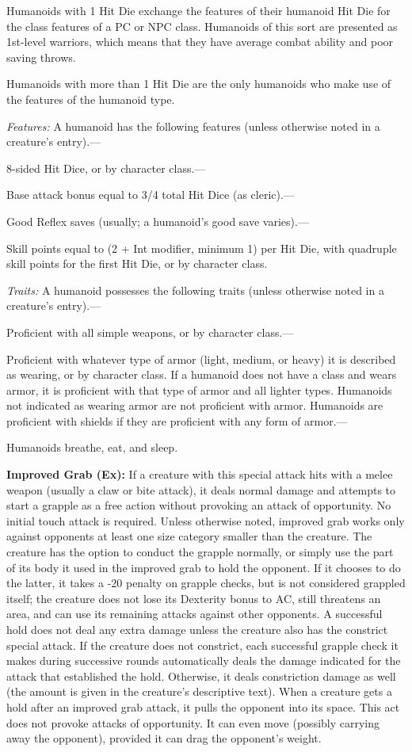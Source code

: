 \documentclass{article}
\begin{document}
Humanoids with 1 Hit Die exchange the features of their humanoid Hit Die for the 
class features of a PC or NPC class. Humanoids of this sort are presented as 1st-level 
warriors, which means that they have average combat ability and poor saving throws.

Humanoids with more than 1 Hit Die are the only humanoids who make use of the features 
of the humanoid type.

\textit{Features: }A humanoid has the following features (unless otherwise noted 
in a creature's entry).---

8-sided Hit Dice, or by character class.---

Base attack bonus equal to 3/4 total Hit Dice (as cleric).---

Good Reflex saves (usually; a humanoid's good save varies).---

Skill points equal to (2 + Int modifier, minimum 1) per Hit Die, with quadruple 
skill points for the first Hit Die, or by character class.

\textit{Traits: }A humanoid possesses the following traits (unless otherwise noted 
in a creature's entry).---

Proficient with all simple weapons, or by character class.---

Proficient with whatever type of armor (light, medium, or heavy) it is described 
as wearing, or by character class. If a humanoid does not have a class and wears 
armor, it is proficient with that type of armor and all lighter types. Humanoids 
not indicated as wearing armor are not proficient with armor. Humanoids are proficient 
with shields if they are proficient with any form of armor.---

Humanoids breathe, eat, and sleep.

\vspace{12pt}
\textbf{Improved Grab (Ex):} If a creature with this special attack hits with a 
melee weapon (usually a claw or bite attack), it deals normal damage and attempts 
to start a grapple as a free action without provoking an attack of opportunity. 
No initial touch attack is required. Unless otherwise noted, improved grab works 
only against opponents at least one size category smaller than the creature. The 
creature has the option to conduct the grapple normally, or simply use the part 
of its body it used in the improved grab to hold the opponent. If it chooses to 
do the latter, it takes a -20 penalty on grapple checks, but is not considered 
grappled itself; the creature does not lose its Dexterity bonus to AC, still threatens 
an area, and can use its remaining attacks against other opponents. A successful 
hold does not deal any extra damage unless the creature also has the constrict 
special attack. If the creature does not constrict, each successful grapple check 
it makes during successive rounds automatically deals the damage indicated for 
the attack that established the hold. Otherwise, it deals constriction damage as 
well (the amount is given in the creature's descriptive text). When a creature 
gets a hold after an improved grab attack, it pulls the opponent into its space. 
This act does not provoke attacks of opportunity. It can even move (possibly carrying 
away the opponent), provided it can drag the opponent's weight. 
\end{document}
